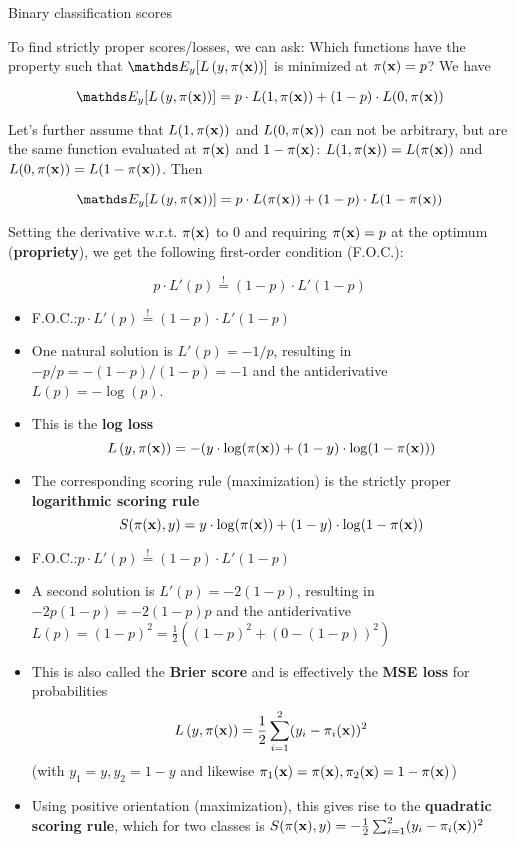 \documentclass[11pt,compress,t,notes=noshow, xcolor=table]{beamer}
\begin{document}
\begin{vbframe}{Binary classification scores}

To find strictly proper scores/losses, we can ask: Which functions have the property such that $\E_y[\Lpixy]$ is minimized at $\pi(\mathbf{x})=p$? We have

$$\E_{y}[\Lpixy]=p \cdot L(1,\pix) + (1-p) \cdot L(0,\pix)$$

Let's further %
assume that $L(1,\pi(\mathbf{x}))$ and $L(0, \pi(\mathbf{x}))$ can not be arbitrary, but are the same function evaluated at $\pi(\mathbf{x})$ and $1-\pi(\mathbf{x})$:
$L(1,\pi(\mathbf{x}))=L(\pi(\mathbf{x}))$ and $L(0,\pi(\mathbf{x}))=L(1-\pi(\mathbf{x}))$. Then

$$\E_{y}[\Lpixy]=p \cdot L(\pix) + (1-p) \cdot L(1-\pix)$$

\vspace{0.2cm}

Setting the derivative w.r.t. $\pi(\mathbf{x})$ to $0$ and requiring $\pi(\mathbf{x})=p$ at the optimum (\textbf{propriety}), we get the following first-order condition (F.O.C.):

\vspace{0.3cm}

$$p \cdot L'(p) \overset{!}{=} (1-p) \cdot L'(1-p)$$

\framebreak

\begin{itemize}\setlength\itemsep{1.9em}
    \item F.O.C.:\quad $p \cdot L'(p) \overset{!}{=} (1-p) \cdot L'(1-p)$
    \item One natural solution is $L'(p)=-1/p$, resulting in $-p/p=-(1-p)/(1-p)=-1$ and the antiderivative $L(p)=-\log(p)$. 
    \item This is the \textbf{log loss} $$L\left(y, \pi(\mathbf{x})\right)=-(y \cdot \log(\pi(\mathbf{x})) + (1-y) \cdot \log(1-\pi(\mathbf{x})))$$
    \item The corresponding scoring rule (maximization) is the strictly proper \textbf{logarithmic scoring rule} $$S(\pi(\mathbf{x}),y)=y \cdot \log(\pi(\mathbf{x})) + (1-y) \cdot \log(1-\pi(\mathbf{x}))$$
\end{itemize}

\framebreak

\begin{itemize} \setlength\itemsep{1.2em}
    \item F.O.C.:\quad $p \cdot L'(p) \overset{!}{=} (1-p) \cdot L'(1-p)$
    \item A second solution is $L'(p)=-2(1-p)$, resulting in $-2p(1-p)=-2(1-p)p$ and the antiderivative $L(p)=(1-p)^2=\frac{1}{2}((1-p)^2+(0-(1-p))^2)$
    \item This is also called the \textbf{Brier score} and is effectively the \textbf{MSE loss} for probabilities $$L\left(y, \pi(\mathbf{x})\right)=\frac{1}{2}\sum_{i=1}^{2}(y_i-\pi_i(\mathbf{x}))^2$$
     {\small (with $y_1=y, y_2=1-y$ and likewise $\pi_1(\mathbf{x})=\pi(\mathbf{x}), \pi_2(\mathbf{x})=1-\pi(\mathbf{x})$)}
    \item Using positive orientation (maximization), this gives rise to the \textbf{quadratic scoring rule}, which for two classes is $S(\pi(\mathbf{x}),y)=-\frac{1}{2} \sum_{i=1}^{2}(y_i-\pi_i(\mathbf{x}))^2$
\end{itemize}

\end{vbframe}



\endlecture
\end{document}
